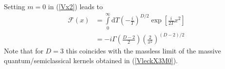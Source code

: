 Setting $m = 0$ in (\ref{Vx2}) leads to
\begin{align}
	\mathcal{F}(x) &= \int\limits_{0}^{\infty} \mathrm{d}T \left(- \frac{i}{T} \right)^{D/2} \exp{\left[ \frac{i}{2 T} x^{2} \right]} \nonumber \\
	&= -i \Gamma\left( \frac{D - 2}{2} \right) \left( \frac{2}{x^{2}} \right)^{(D - 2)/2}
\end{align}
Note that for $D = 3$ this coincides with the massless limit of the massive quantum/semiclassical kernels obtained in (\ref{VleckX3M0}).